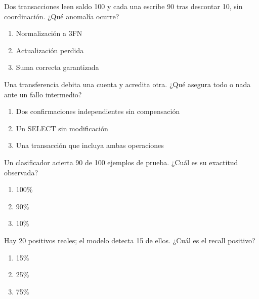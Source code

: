 \noindent\begin{minipage}{\linewidth}\setlength{\parskip}{4pt}\label{q:S-086}
Dos transacciones leen saldo 100 y cada una escribe 90 tras descontar 10, sin coordinación. ¿Qué anomalía ocurre?
\begin{enumerate}[label=\Alph*),nosep]
\item Normalización a 3FN
\item Actualización perdida
\item Suma correcta garantizada
\end{enumerate}\end{minipage}\par\medskip

\noindent\begin{minipage}{\linewidth}\setlength{\parskip}{4pt}\label{q:S-087}
Una transferencia debita una cuenta y acredita otra. ¿Qué asegura todo o nada ante un fallo intermedio?
\begin{enumerate}[label=\Alph*),nosep]
\item Dos confirmaciones independientes sin compensación
\item Un SELECT sin modificación
\item Una transacción que incluya ambas operaciones
\end{enumerate}\end{minipage}\par\medskip

\noindent\begin{minipage}{\linewidth}\setlength{\parskip}{4pt}\label{q:S-088}
Un clasificador acierta 90 de 100 ejemplos de prueba. ¿Cuál es su exactitud observada?
\begin{enumerate}[label=\Alph*),nosep]
\item 100\%
\item 90\%
\item 10\%
\end{enumerate}\end{minipage}\par\medskip

\noindent\begin{minipage}{\linewidth}\setlength{\parskip}{4pt}\label{q:S-089}
Hay 20 positivos reales; el modelo detecta 15 de ellos. ¿Cuál es el recall positivo?
\begin{enumerate}[label=\Alph*),nosep]
\item 15\%
\item 25\%
\item 75\%
\end{enumerate}\end{minipage}\par\medskip

